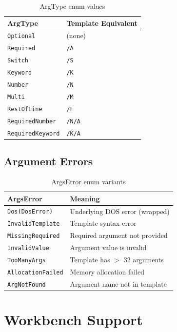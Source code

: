 \begin{table}[h]
\centering
\begin{tabular}{ll}
\textbf{ArgType} & \textbf{Template Equivalent} \\
\hline
\texttt{Optional} & (none) \\
\texttt{Required} & \texttt{/A} \\
\texttt{Switch} & \texttt{/S} \\
\texttt{Keyword} & \texttt{/K} \\
\texttt{Number} & \texttt{/N} \\
\texttt{Multi} & \texttt{/M} \\
\texttt{RestOfLine} & \texttt{/F} \\
\texttt{RequiredNumber} & \texttt{/N/A} \\
\texttt{RequiredKeyword} & \texttt{/K/A} \\
\end{tabular}
\caption{ArgType enum values}
\end{table}

\subsection{Argument Errors}

\begin{table}[h]
\centering
\begin{tabular}{ll}
\textbf{ArgsError} & \textbf{Meaning} \\
\hline
\texttt{Dos(DosError)} & Underlying DOS error (wrapped) \\
\texttt{InvalidTemplate} & Template syntax error \\
\texttt{MissingRequired} & Required argument not provided \\
\texttt{InvalidValue} & Argument value is invalid \\
\texttt{TooManyArgs} & Template has $>$ 32 arguments \\
\texttt{AllocationFailed} & Memory allocation failed \\
\texttt{ArgNotFound} & Argument name not in template \\
\end{tabular}
\caption{ArgsError enum variants}
\end{table}

\section{Workbench Support}
\label{sec:workbench}

